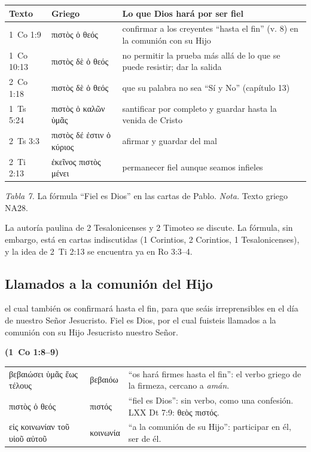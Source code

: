 \documentclass[11pt,letterpaper]{article}
\newcommand{\grc}[1]{\foreignlanguage{ancientgreek}{#1}}
\newcommand{\fuente}[1]{\par\hfill{\upshape\bfseries\small\textcolor{azul}{#1}}}
\begin{document}
\begin{center}\small\renewcommand{\arraystretch}{1.22}
\begin{tabular}{@{}L{2.2cm}L{5.4cm}L{6.8cm}@{}}
\toprule
\textbf{Texto} & \textbf{Griego} & \textbf{Lo que Dios hará por ser fiel} \\ ~Co 1:9 & \grc{πιστὸς ὁ θεός} & confirmar a los creyentes ``hasta el fin'' (v. 8) en la comunión con su Hijo \\
1~Co 10:13 & \grc{πιστὸς δὲ ὁ θεός} & no permitir la prueba más allá de lo que se puede resistir; dar la salida \\
2~Co 1:18 & \grc{πιστὸς δὲ ὁ θεός} & que su palabra no sea ``Sí y No'' (capítulo 13) \\
1~Ts 5:24 & \grc{πιστὸς ὁ καλῶν ὑμᾶς} & santificar por completo y guardar hasta la venida de Cristo \\
2~Ts 3:3 & \grc{πιστὸς δέ ἐστιν ὁ κύριος} & afirmar y guardar del mal \\
2~Ti 2:13 & \grc{ἐκεῖνος πιστὸς μένει} & permanecer fiel aunque seamos infieles \\
\bottomrule
\end{tabular}\par
{\footnotesize\color{gris}\textit{Tabla 7.} La fórmula ``Fiel es Dios'' en las cartas de Pablo. \textit{Nota.} Texto griego NA28.}
\end{center}

\begin{nota}[Precisión]
La autoría paulina de 2 Tesalonicenses y 2 Timoteo se discute. La fórmula, sin embargo, está en cartas indiscutidas (1 Corintios, 2 Corintios, 1 Tesalonicenses), y la idea de 2~Ti 2:13 se encuentra ya en Ro 3:3--4.
\end{nota}

\subsection{Llamados a la comunión del Hijo}
\begin{cita}el cual también os confirmará hasta el fin, para que seáis irreprensibles en el día de nuestro Señor Jesucristo. Fiel es Dios, por el cual fuisteis llamados a la comunión con su Hijo Jesucristo nuestro Señor.\fuente{(1~Co 1:8--9)}\end{cita}

\begin{filologia}[1 Co 1:8--9]
\begin{tabular}{@{}L{3.2cm}L{1.6cm}L{10cm}@{}}
\grc{βεβαιώσει ὑμᾶς ἕως τέλους} & \grc{βεβαιόω} & ``os hará firmes hasta el fin'': el verbo griego de la firmeza, cercano a \emph{amán}. \\[2pt]
\grc{πιστὸς ὁ θεός} & \grc{πιστός} & ``fiel es Dios'': sin verbo, como una confesión. LXX Dt 7:9: \grc{θεὸς πιστός}. \\[2pt]
\grc{εἰς κοινωνίαν τοῦ υἱοῦ αὐτοῦ} & \grc{κοινωνία} & ``a la comunión de su Hijo'': participar en él, ser de él. \\
\end{tabular}
\end{filologia}
\end{document}
